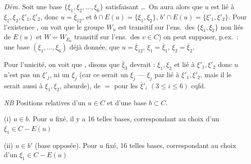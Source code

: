 \documentclass[11pt,a4paper]{article}
\begin{document}
\emph{Dém.} Soit une base $\lbrace \xi_1, \xi_2, \ldots, \xi_6 \rbrace$
satisfaisant  \ldots\ On aura alors \struck{\ill{}} que
$u$ est lié à $\xi_1, \xi_2, \xi'_1, \xi'_2$, donc $u = \bar{\xi}_{12}$, et $b
\cap E(u) = \lbrace \xi_1, \xi_2 \rbrace$, $b' \cap E(u) = \lbrace \xi'_1,
\xi'_2 \rbrace$. Pour l'existence , on voit que  le groupe $W_u$ est
transitif sur l'ens.\ des   $\lbrace \xi_1, \xi_2
\rbrace$ non liés de $E(u)$ et $W = W_{E_6}$ transitif sur l'ens.\ des $v \in
C$) on peut supposer, p.ex.\ : une base $(\xi_1, \ldots, \xi_6)$ déjà donnée,
que $u = \bar{\xi}_{12}$, $\xi_1 = \bar{\xi}_1$, $\xi_2 = \bar{\xi}_2$.

Pour l'unicité, on voit que , disons que $\bar{\xi}_3$ devrait \ill{} : $\xi_1, \xi_2$ et
lié à $\xi'_1, \xi'_2$ donc $u$ n'est pas un $\xi'_j$, ni un $\xi_j$ (car ce
serait un $\xi_j$ --- $\xi_j$ par \ill{} lié à $\xi'_1, \xi'_2$, mais il le
serait aussi à $\xi_1, \xi_2$, absurde), de $=$ pour les $\bar{\xi}'_i$ $(3
\leqslant i \leqslant 6)$ cqfd.

\emph{NB} Positions relatives 
d'un $u \in C$ et d'une base $b \subset C$.

(i) $u \in b$. Pour $u$  fixé, il y a 16 telles bases,
correspondant au choix d'un $\xi_1 \in C - E(u)$

(ii) $u \in b'$ (base opposée). Pour $u$  fixé, 16 telles bases,
correspondant au choix d'un $\xi_1 \in C - E(u)$
\end{document}
